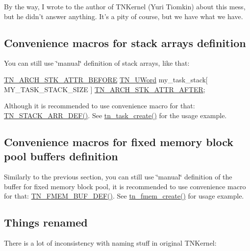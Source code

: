 By the way, I wrote to the author of T\+N\+Kernel (Yuri Tiomkin) about this mess, but he didn't answer anything. It's a pity of course, but we have what we have.\hypertarget{tnkernel_diff_tnkernel_new_api__convenience_macros_stack}{}\subsection{Convenience macros for stack arrays definition}\label{tnkernel_diff_tnkernel_new_api__convenience_macros_stack}
You can still use \char`\"{}manual\char`\"{} definition of stack arrays, like that\+:


\begin{DoxyCode}
\hyperlink{tn__arch__example_8h_ae245dddb19cd7c12b7038a62d576fafa}{TN\_ARCH\_STK\_ATTR\_BEFORE}
\hyperlink{tn__arch__example_8h_ab80cba0fe9ffcd9011d53dfeb9e39bf4}{TN\_UWord} my\_task\_stack[ MY\_TASK\_STACK\_SIZE ]
\hyperlink{tn__arch__example_8h_ab082613959b539182b8b47bc87d18d6a}{TN\_ARCH\_STK\_ATTR\_AFTER};
\end{DoxyCode}


Although it is recommended to use convenience macro for that\+: {\ttfamily \hyperlink{tn__sys_8h_ad61af0f0e9ab96bdf1ac1bf1e03e3c75}{T\+N\+\_\+\+S\+T\+A\+C\+K\+\_\+\+A\+R\+R\+\_\+\+D\+E\+F()}}. See {\ttfamily \hyperlink{tn__tasks_8h_a548d5adda09d1b4e393b5df0e9e1a7a5}{tn\+\_\+task\+\_\+create()}} for the usage example.\hypertarget{tnkernel_diff_tnkernel_new_api__convenience_macros_fmem}{}\subsection{Convenience macros for fixed memory block pool buffers definition}\label{tnkernel_diff_tnkernel_new_api__convenience_macros_fmem}
Similarly to the previous section, you can still use \char`\"{}manual\char`\"{} definition of the buffer for fixed memory block pool, it is recommended to use convenience macro for that\+: {\ttfamily \hyperlink{tn__fmem_8h_ab45e9c2ad4a64345214f9a912bf76fc3}{T\+N\+\_\+\+F\+M\+E\+M\+\_\+\+B\+U\+F\+\_\+\+D\+E\+F()}}. See {\ttfamily \hyperlink{tn__fmem_8h_a56d47d4a1b6453d959336448a0ce96ac}{tn\+\_\+fmem\+\_\+create()}} for usage example.\hypertarget{tnkernel_diff_tnkernel_diff_api_rename}{}\subsection{Things renamed}\label{tnkernel_diff_tnkernel_diff_api_rename}
There is a lot of inconsistency with naming stuff in original T\+N\+Kernel\+:


